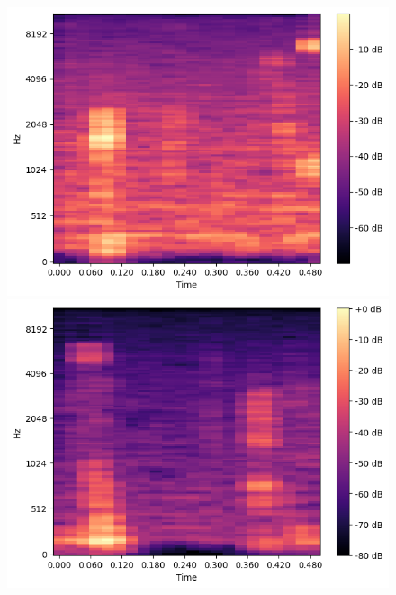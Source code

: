 \begin{figure}[t]
\begin{minipage}[b]{0.16\hsize}
        \includegraphics[width=\hsize]{img/melspec/hamburg.png}
    \end{minipage}
    \begin{minipage}[b]{0.16\hsize}
        \centering
        \includegraphics[width=\hsize]{img/melspec/salad-chicken.png}
    \end{minipage}
    \begin{minipage}[b]{0.16\hsize}
        \centering

\end{minipage}
\end{figure}
